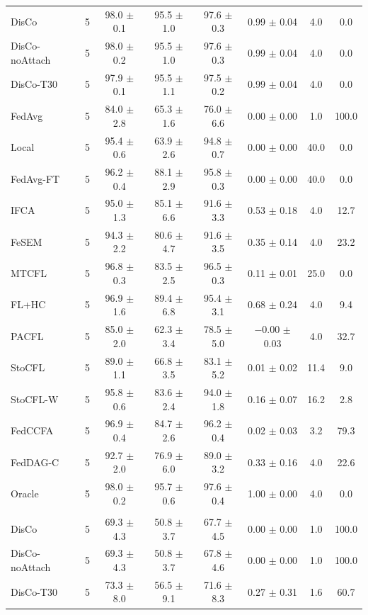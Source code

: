 {{\begin{tabular}{l r c c c c c c}
DisCo & 5 & 98.0 $\pm$ 0.1 & 95.5 $\pm$ 1.0 & 97.6 $\pm$ 0.3 & 0.99 $\pm$ 0.04 & 4.0 & 0.0 \\
DisCo-noAttach & 5 & 98.0 $\pm$ 0.2 & 95.5 $\pm$ 1.0 & 97.6 $\pm$ 0.3 & 0.99 $\pm$ 0.04 & 4.0 & 0.0 \\
DisCo-T30 & 5 & 97.9 $\pm$ 0.1 & 95.5 $\pm$ 1.1 & 97.5 $\pm$ 0.2 & 0.99 $\pm$ 0.04 & 4.0 & 0.0 \\
FedAvg & 5 & 84.0 $\pm$ 2.8 & 65.3 $\pm$ 1.6 & 76.0 $\pm$ 6.6 & 0.00 $\pm$ 0.00 & 1.0 & 100.0 \\
Local & 5 & 95.4 $\pm$ 0.6 & 63.9 $\pm$ 2.6 & 94.8 $\pm$ 0.7 & 0.00 $\pm$ 0.00 & 40.0 & 0.0 \\
FedAvg-FT & 5 & 96.2 $\pm$ 0.4 & 88.1 $\pm$ 2.9 & 95.8 $\pm$ 0.3 & 0.00 $\pm$ 0.00 & 40.0 & 0.0 \\
IFCA & 5 & 95.0 $\pm$ 1.3 & 85.1 $\pm$ 6.6 & 91.6 $\pm$ 3.3 & 0.53 $\pm$ 0.18 & 4.0 & 12.7 \\
FeSEM & 5 & 94.3 $\pm$ 2.2 & 80.6 $\pm$ 4.7 & 91.6 $\pm$ 3.5 & 0.35 $\pm$ 0.14 & 4.0 & 23.2 \\
MTCFL & 5 & 96.8 $\pm$ 0.3 & 83.5 $\pm$ 2.5 & 96.5 $\pm$ 0.3 & 0.11 $\pm$ 0.01 & 25.0 & 0.0 \\
FL+HC & 5 & 96.9 $\pm$ 1.6 & 89.4 $\pm$ 6.8 & 95.4 $\pm$ 3.1 & 0.68 $\pm$ 0.24 & 4.0 & 9.4 \\
PACFL & 5 & 85.0 $\pm$ 2.0 & 62.3 $\pm$ 3.4 & 78.5 $\pm$ 5.0 & $-$0.00 $\pm$ 0.03 & 4.0 & 32.7 \\
StoCFL & 5 & 89.0 $\pm$ 1.1 & 66.8 $\pm$ 3.5 & 83.1 $\pm$ 5.2 & 0.01 $\pm$ 0.02 & 11.4 & 9.0 \\
StoCFL-W & 5 & 95.8 $\pm$ 0.6 & 83.6 $\pm$ 2.4 & 94.0 $\pm$ 1.8 & 0.16 $\pm$ 0.07 & 16.2 & 2.8 \\
FedCCFA & 5 & 96.9 $\pm$ 0.4 & 84.7 $\pm$ 2.6 & 96.2 $\pm$ 0.4 & 0.02 $\pm$ 0.03 & 3.2 & 79.3 \\
FedDAG-C & 5 & 92.7 $\pm$ 2.0 & 76.9 $\pm$ 6.0 & 89.0 $\pm$ 3.2 & 0.33 $\pm$ 0.16 & 4.0 & 22.6 \\
Oracle & 5 & 98.0 $\pm$ 0.2 & 95.7 $\pm$ 0.6 & 97.6 $\pm$ 0.4 & 1.00 $\pm$ 0.00 & 4.0 & 0.0 \\
\addlinespace
\multicolumn{8}{l}{\textit{SVHN rotation}} \\
DisCo & 5 & 69.3 $\pm$ 4.3 & 50.8 $\pm$ 3.7 & 67.7 $\pm$ 4.5 & 0.00 $\pm$ 0.00 & 1.0 & 100.0 \\
DisCo-noAttach & 5 & 69.3 $\pm$ 4.3 & 50.8 $\pm$ 3.7 & 67.8 $\pm$ 4.6 & 0.00 $\pm$ 0.00 & 1.0 & 100.0 \\
DisCo-T30 & 5 & 73.3 $\pm$ 8.0 & 56.5 $\pm$ 9.1 & 71.6 $\pm$ 8.3 & 0.27 $\pm$ 0.31 & 1.6 & 60.7 \\

\end{tabular}}}

